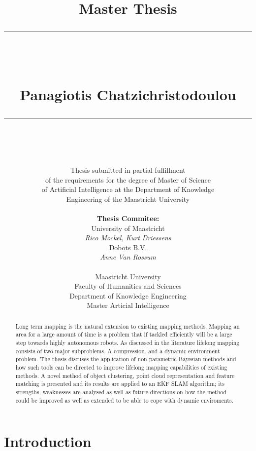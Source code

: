 \documentclass[twoside,hidelinks]{article}
\title{
\Huge{Master Thesis} \\
\noindent\rule{4cm}{0.4pt} \\
\vspace{5mm}
\huge{\selectfont{Towards lifelong mapping in pointclouds}}
\vspace{5mm} \\
\normalsize Panagiotis Chatzichristodoulou \\
\noindent\rule{4cm}{0.4pt} \\
\vspace{5mm}
\fontsize{24pt}{10pt}{Master Thesis DKE 09-16 }} %
\author{
\normalsize Thesis submitted in partial fulfillment\\
\normalsize  of the requirements for the degree of Master of Science \\
\normalsize of Artificial Intelligence at the Department of Knowledge \\
\normalsize  Engineering of the Maastricht University \\
\vspace{5mm} \\
\normalsize \textbf{Thesis Commitee:} \\ 
\normalsize University of Maastricht \\ %
\normalsize \textit{Rico Mockel, Kurt Driessens} \\
\normalsize Dobots B.V.\\
\normalsize \textit{Anne Van Rossum} \\
\vspace{0mm} \\
\normalsize Maastricht University \\
\normalsize Faculty of Humanities and Sciences \\ 
\normalsize Department of Knowledge Engineering \\
\normalsize Master Articial Intelligence \\
}
\begin{document}
\maketitle %

\thispagestyle{fancy} %


\newpage 
\begin{abstract}

\noindent Long term mapping is the natural extension to existing mapping methods. Mapping an area for a large amount of time is a problem that if tackled efficiently will be a large step towards highly autonomous robots. As discussed in the literature lifelong mapping consists of two major subproblems. A compression, and a dynamic environment problem. The thesis discuses the application of non parametric Bayesian methods and how such tools can be directed to improve lifelong mapping capabilities of existing methods. A novel method of object clustering, point cloud representation and feature matching is presented and its results are applied to an EKF SLAM algorithm; its strengths, weaknesses are analysed as well as future directions on how the method could be improved as well as extended to be able to cope with dynamic enviroments.


\end{abstract}

\newpage
\thispagestyle{empty}
 
\tableofcontents

\listoffigures
 
\listoftables
 
\newpage


\section{Introduction}
\end{document}
